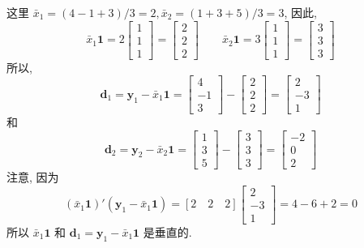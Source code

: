 这里 $\bar{x}_{1}=(4-1+3)/3=2,\bar{x}_{2}=(1+3+5)/3=3$, 因此,
\[
\bar{x}_{1}\mathbf{1}=2\begin{bmatrix}1\\1\\1\end{bmatrix}=\begin{bmatrix}2\\2\\2\end{bmatrix}\qquad
\bar{x}_{2}\mathbf{1}=3\begin{bmatrix}1\\1\\1\end{bmatrix}=\begin{bmatrix}3\\3\\3\end{bmatrix}
\]
所以,
\[
\mathbf{d}_{1}=\mathbf{y}_{1}-\bar{x}_{1}\mathbf{1}=\begin{bmatrix}4\\-1\\3\end{bmatrix}-\begin{bmatrix}2\\2\\2\end{bmatrix}=\begin{bmatrix}2\\-3\\1\end{bmatrix}
\]
和
\[
\mathbf{d}_{2}=\mathbf{y}_{2}-\bar{x}_{2}\mathbf{1}=\begin{bmatrix}1\\3\\5\end{bmatrix}-\begin{bmatrix}3\\3\\3\end{bmatrix}=\begin{bmatrix}-2\\0\\2\end{bmatrix}
\]
注意, 因为
\[
(\bar{x}_{1}\mathbf{1})'(\mathbf{y}_{1}-\bar{x}_{1}\mathbf{1})=[2\quad2\quad2]\begin{bmatrix}2\\-3\\1\end{bmatrix}=4-6+2=0
\]
所以 $\bar{x}_{1}\mathbf{1}$ 和 $\mathbf{d}_{1}=\mathbf{y}_{1}-\bar{x}_{1}\mathbf{1}$ 是垂直的.

